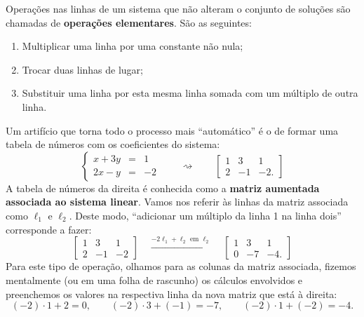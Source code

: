 \vspace{0.2cm}

Operações nas linhas de um sistema que não alteram o conjunto de soluções são chamadas de \textbf{operações elementares}. São as seguintes:
\begin{enumerate}
  \item Multiplicar uma linha por uma constante não nula;
  \item Trocar duas linhas de lugar;
  \item Substituir uma linha por esta mesma linha somada com um múltiplo de outra linha.
\end{enumerate}

\vspace{0.2cm}

Um artifício que torna todo o processo mais ``automático'' é o de formar uma tabela de números com os coeficientes do sistema:
\begin{equation}
  \left\{
    \begin{array}{rcl}
      x+3y&=&1 \\
      2x-y&=&-2
    \end{array}
  \right. \qquad \rightsquigarrow \qquad  \left[
                             \begin{array}{cc|c}
                               1 & 3 & 1 \\
                               2 & -1 & -2.
                             \end{array}
                           \right]
\end{equation} A tabela de números da direita é conhecida como a \textbf{matriz aumentada associada ao sistema linear}. Vamos nos referir às linhas da matriz associada como $\ell_1$ e $\ell_2$. Deste modo, ``adicionar um múltiplo da linha 1 na linha dois'' corresponde a fazer:
\begin{equation}
\left[
                             \begin{array}{cc|c}
                               1 & 3 & 1 \\
                               2 & -1 & -2
                             \end{array}
                           \right] \quad \xrightarrow{-2\ell_1 + \ell_2 \text{ em } \ell_2} \quad
\left[
                             \begin{array}{cc|c}
                               1 & 3 & 1 \\
                               0 & -7 & -4.
                             \end{array}
                           \right]
\end{equation} Para este tipo de operação, olhamos para as colunas da matriz associada, fizemos mentalmente (ou em uma folha de rascunho) os cálculos envolvidos e preenchemos os valores na respectiva linha da nova matriz que está à direita:
\begin{equation}
(-2)\cdot 1 + 2 = 0, \qquad (-2)\cdot 3 + (-1) = -7, \qquad (-2) \cdot 1 + (-2) = -4.
\end{equation}



